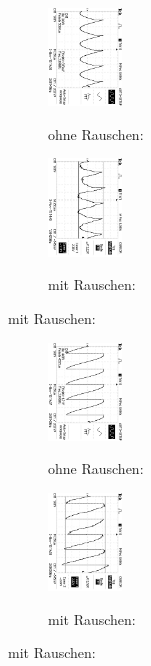 \begin{figure}
\caption{$U_{out} (\phi = 180°$) }
\begin{subfigure}{0.48\textwidth}
\centering
\caption*{ohne Rauschen:}
\includegraphics[angle=90,height=2.6cm]{graphics/ALL0034/F0034TEK.jpg}
\label{fig:phi180o}
\end{subfigure}
\begin{subfigure}{0.48\textwidth}
\centering
\caption*{mit Rauschen:}
\includegraphics[angle=90,height=2.6cm]{graphics/ALL0042/F0042TEK.jpg}
\label{fig:phi180m}
\end{subfigure}
\end{figure}
\addtocounter{figure}{-1}
\begin{figure}
\caption{$U_{out} (\phi = 270°$)}
\begin{subfigure}{0.48\textwidth}
\centering
\caption*{ohne Rauschen:}
\includegraphics[angle=90,height=2.6cm]{graphics/ALL0035/F0035TEK.jpg}
\label{fig:phi270o}
\end{subfigure}
\begin{subfigure}{0.48\textwidth}
\centering
\caption*{mit Rauschen:}
\includegraphics[angle=90,height=2.6cm]{graphics/ALL0043/F0043TEK.jpg}
\label{fig:phi270m}
\end{subfigure}
\end{figure}
\addtocounter{figure}{-1}
